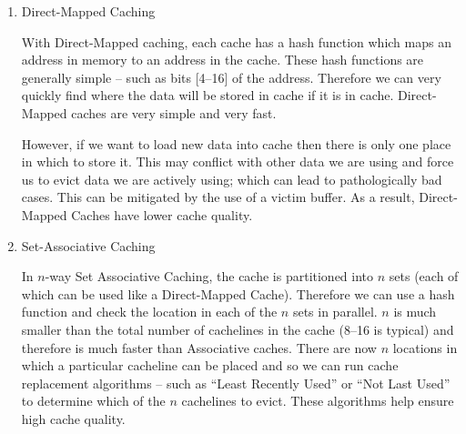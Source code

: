 \documentclass[10pt,\jkfside,a4paper]{article}
\begin{document}
\begin{enumerate}
\begin{enumerate}[label=(\alph*)]
\item Direct-Mapped Caching

With Direct-Mapped caching, each cache has a hash function which maps an
address in memory to an address in the cache. These hash functions are
generally simple -- such as bits [4--16] of the address. Therefore we can
very quickly find where the data will be stored in cache if it is in cache.
Direct-Mapped caches are very simple and very fast.

However, if we want to load new data into cache then there is only one place
in which to store it. This may conflict with other data we are using and
force us to evict data we are actively using; which can lead to pathologically
bad cases. This can be mitigated by the use of a victim buffer.
As a result, Direct-Mapped Caches have lower cache quality.

\item Set-Associative Caching

In $n$-way Set Associative Caching, the cache is partitioned into $n$
sets (each of which can be used like a Direct-Mapped Cache). Therefore we can
use a hash function and check the location in each of the $n$ sets in
parallel. $n$ is much smaller than the total number of cachelines in the
cache (8--16 is typical) and therefore is much faster than Associative
caches. There are now $n$ locations in which a particular cacheline can be
placed and so we can run cache replacement algorithms -- such as ``Least
Recently Used'' or ``Not Last Used'' to determine which of the $n$
cachelines to evict. These algorithms help ensure high cache quality.

\end{enumerate}

\end{enumerate}
\end{document}
